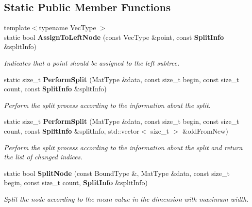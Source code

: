 \subsection*{Static Public Member Functions}
\begin{DoxyCompactItemize}
\item 
{\footnotesize template$<$typename Vec\+Type $>$ }\\static bool {\bf Assign\+To\+Left\+Node} (const Vec\+Type \&point, const {\bf Split\+Info} \&split\+Info)
\begin{DoxyCompactList}\small\item\em Indicates that a point should be assigned to the left subtree. \end{DoxyCompactList}\item 
static size\+\_\+t {\bf Perform\+Split} (Mat\+Type \&data, const size\+\_\+t begin, const size\+\_\+t count, const {\bf Split\+Info} \&split\+Info)
\begin{DoxyCompactList}\small\item\em Perform the split process according to the information about the split. \end{DoxyCompactList}\item 
static size\+\_\+t {\bf Perform\+Split} (Mat\+Type \&data, const size\+\_\+t begin, const size\+\_\+t count, const {\bf Split\+Info} \&split\+Info, std\+::vector$<$ size\+\_\+t $>$ \&old\+From\+New)
\begin{DoxyCompactList}\small\item\em Perform the split process according to the information about the split and return the list of changed indices. \end{DoxyCompactList}\item 
static bool {\bf Split\+Node} (const Bound\+Type \&, Mat\+Type \&data, const size\+\_\+t begin, const size\+\_\+t count, {\bf Split\+Info} \&split\+Info)
\begin{DoxyCompactList}\small\item\em Split the node according to the mean value in the dimension with maximum width. \end{DoxyCompactList}\end{DoxyCompactItemize}
